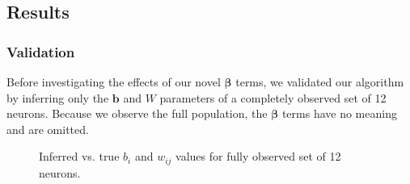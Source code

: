 \documentclass{article}
\begin{document}
\subsection{Results}

\subsubsection{Validation}

Before investigating the effects of our novel $\bm{\beta}$ terms, we validated our algorithm by inferring only the $\mathbf{b}$ and $W$ parameters of a completely observed set of 12 neurons. Because we observe the full population, the $\bm{\beta}$ terms have no meaning and are omitted.

\begin{figure}
\label{validation}
\centering
{}
\caption{Inferred vs. true $b_i$ and $w_{ij}$ values for fully observed set of 12 neurons.}
\end{figure}
\end{document}
